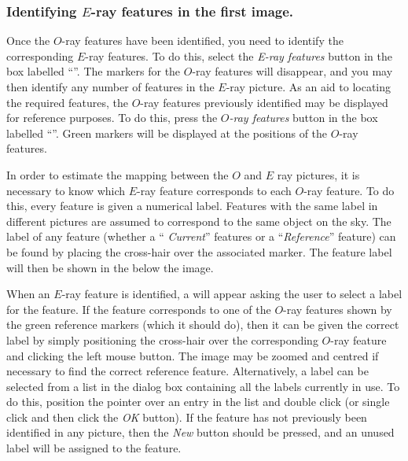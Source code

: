 \subsubsection {Identifying $E$-ray features in the first image.}
Once the $O$-ray features have been identified, you need to identify the
corresponding $E$-ray features. To do this, select the {\em E-ray
features} button in the box labelled ``''. The markers for the $O$-ray features will
disappear, and you may then identify any number of features in the
$E$-ray picture. As an aid to locating the required features, the $O$-ray
features previously identified may be displayed for reference purposes. To
do this, press the {\em $O$-ray features} button in the box labelled
``''. Green markers will be
displayed at the positions of the $O$-ray features.

In order to estimate the mapping between the $O$ and $E$ ray pictures, it
is necessary to know which $E$-ray feature corresponds to each $O$-ray
feature. To do this, every feature is given a numerical label. Features
with the same label in different pictures are assumed to correspond to
the same object on the sky. The label of any feature (whether a ``{\em
Current}'' features or a ``{\em Reference}'' feature) can be found by
placing the cross-hair over the associated marker. The feature label
will then be shown in the  below 
the image.

When an $E$-ray feature is identified, a  will appear asking the user to select a label for
the feature. If the feature corresponds to one of the $O$-ray features
shown by the green reference markers (which it should do), then it can be
given the correct label by simply positioning the cross-hair over the
corresponding $O$-ray feature and clicking the left mouse button. The
image may be zoomed and centred if necessary to find the correct
reference feature. Alternatively, a label can be selected from a list in
the dialog box containing all the labels currently in use. To do this,
position the pointer over an entry in the list and double click (or
single click and then click the {\em OK} button). If the feature has not
previously been identified in any picture, then the {\em New} button
should be pressed, and an unused label will be assigned to the feature.

